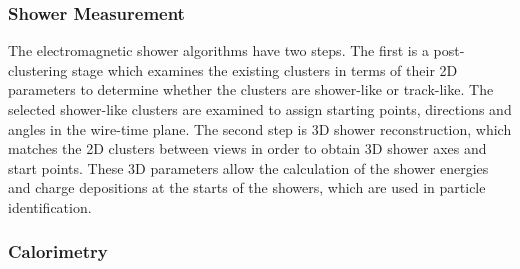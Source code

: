 

\subsubsection{Shower Measurement}


The electromagnetic shower algorithms have two
steps. The first is a post-clustering stage which examines the
existing clusters in terms of their 2D parameters to determine whether
the clusters are shower-like or track-like. 
The selected shower-like clusters are examined to assign starting points,
directions and angles in the wire-time plane. The second step is 
3D shower reconstruction, which
matches the 2D clusters between views in order to obtain 3D shower axes and start points.
These 3D parameters allow the calculation of the shower energies and charge
depositions at the starts of the showers, which are used in particle
identification. 


\subsubsection{Calorimetry}


